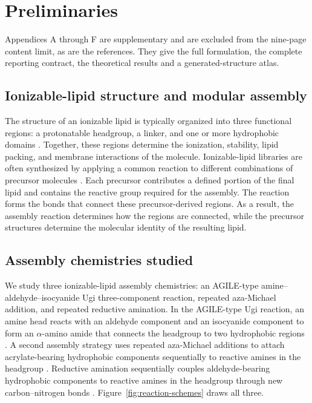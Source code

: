 \documentclass{article}
\begin{document}


\clearpage
\appendix

\section{Preliminaries}
\label{app:preliminaries}

Appendices A through F are supplementary and are excluded from the nine-page content limit,
as are the references. They give the full formulation, the complete reporting contract,
the theoretical results and a generated-structure atlas.

\subsection{Ionizable-lipid structure and modular assembly}

The structure of an ionizable lipid is typically organized into three functional regions: a
protonatable headgroup, a linker, and one or more hydrophobic domains
\citep{semple2010rational,jayaraman2012maximizing}.
Together, these regions determine the ionization, stability, lipid packing, and membrane
interactions of the molecule.
Ionizable-lipid libraries are often synthesized by applying a common reaction to different
combinations of precursor molecules
\citep{akinc2008combinatorial,love2010lipidlike,li2024accelerating,xu2024agile}.
Each precursor contributes a defined portion of the final lipid and contains the reactive group
required for the assembly.
The reaction forms the bonds that connect these precursor-derived regions.
As a result, the assembly reaction determines how the regions are connected, while the precursor
structures determine the molecular identity of the resulting lipid.

\subsection{Assembly chemistries studied}

We study three ionizable-lipid assembly chemistries: an AGILE-type
amine--aldehyde--isocyanide Ugi three-component reaction, repeated aza-Michael addition, and
repeated reductive amination.
In the AGILE-type Ugi reaction, an amine head reacts with an aldehyde component and an isocyanide
component to form an $\alpha$-amino amide that connects the headgroup to two hydrophobic regions
\citep{xu2024agile}.
A second assembly strategy uses repeated aza-Michael additions to attach acrylate-bearing
hydrophobic components sequentially to reactive amines in the headgroup
\citep{li2023combinatorial}.
Reductive amination sequentially couples aldehyde-bearing hydrophobic components to reactive amines
in the headgroup through new carbon--nitrogen bonds \citep{xue2024barcoding}.
Figure~\ref{fig:reaction-schemes} draws all three.
\end{document}
